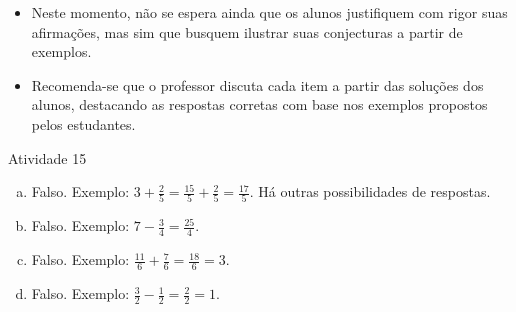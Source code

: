    \vspace{.15cm}

  \begin{itemize} %
    \item       Neste momento, não se espera ainda que os alunos justifiquem com rigor suas afirmações, mas sim que busquem ilustrar suas conjecturas a partir de exemplos.
    \item       Recomenda-se que o professor discuta cada item a partir das soluções dos alunos, destacando as respostas corretas com base nos exemplos propostos pelos estudantes.
\end{itemize} %


\begin{resposta*}{Atividade 15}

\begin{enumerate} [a)] %
    \item       Falso. Exemplo: $3 + \frac{2}{5} = \frac{15}{5}+\frac{2}{5} = \frac{17}{5}$.  Há outras possibilidades de respostas.
    \item       Falso. Exemplo:       $7 - \frac{3}{4} = \frac{25}{4}$.
    \item       Falso. Exemplo:       $\frac{11}{6} + \frac{7}{6} = \frac{18}{6} = 3$.
    \item       Falso. Exemplo:       $\frac{3}{2} - \frac{1}{2} = \frac{2}{2} = 1$.
\end{enumerate} %


\end{resposta*}

